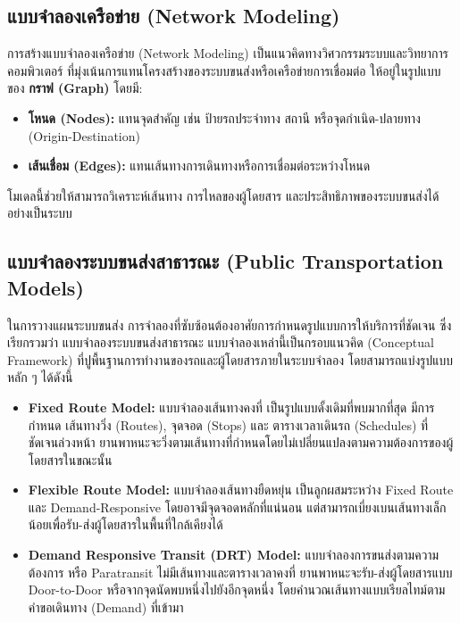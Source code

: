 \subsection{แบบจำลองเครือข่าย (Network Modeling)}
\begin{mypara}
    \indent การสร้างแบบจำลองเครือข่าย (Network Modeling) เป็นแนวคิดทางวิศวกรรมระบบและวิทยาการคอมพิวเตอร์ 
    ที่มุ่งเน้นการแทนโครงสร้างของระบบขนส่งหรือเครือข่ายการเชื่อมต่อ 
    ให้อยู่ในรูปแบบของ \textbf{กราฟ (Graph)} โดยมี:
\end{mypara}
\begin{itemize}
    \item \textbf{โหนด (Nodes):} แทนจุดสำคัญ เช่น ป้ายรถประจำทาง สถานี หรือจุดกำเนิด-ปลายทาง (Origin-Destination)
    \item \textbf{เส้นเชื่อม (Edges):} แทนเส้นทางการเดินทางหรือการเชื่อมต่อระหว่างโหนด
\end{itemize}
\begin{mypara}
    โมเดลนี้ช่วยให้สามารถวิเคราะห์เส้นทาง การไหลของผู้โดยสาร และประสิทธิภาพของระบบขนส่งได้อย่างเป็นระบบ
\end{mypara}

\subsection{แบบจำลองระบบขนส่งสาธารณะ (Public Transportation Models)}
\begin{mypara}
    \indent ในการวางแผนระบบขนส่ง การจำลองที่ซับซ้อนต้องอาศัยการกำหนดรูปแบบการให้บริการที่ชัดเจน 
    ซึ่งเรียกรวมว่า แบบจำลองระบบขนส่งสาธารณะ แบบจำลองเหล่านี้เป็นกรอบแนวคิด (Conceptual Framework) 
    ที่ปูพื้นฐานการทำงานของรถและผู้โดยสารภายในระบบจำลอง โดยสามารถแบ่งรูปแบบหลัก ๆ ได้ดังนี้
    \begin{itemize}
        \item \textbf{Fixed Route Model:} แบบจำลองเส้นทางคงที่ เป็นรูปแบบดั้งเดิมที่พบมากที่สุด มีการกำหนด เส้นทางวิ่ง (Routes), จุดจอด (Stops) และ ตารางเวลาเดินรถ (Schedules) ที่ชัดเจนล่วงหน้า ยานพาหนะจะวิ่งตามเส้นทางที่กำหนดโดยไม่เปลี่ยนแปลงตามความต้องการของผู้โดยสารในขณะนั้น
        \item \textbf{Flexible Route Model:} แบบจำลองเส้นทางยืดหยุ่น เป็นลูกผสมระหว่าง Fixed Route และ Demand-Responsive โดยอาจมีจุดจอดหลักที่แน่นอน แต่สามารถเบี่ยงเบนเส้นทางเล็กน้อยเพื่อรับ-ส่งผู้โดยสารในพื้นที่ใกล้เคียงได้
        \item \textbf{Demand Responsive Transit (DRT) Model:} แบบจำลองการขนส่งตามความต้องการ หรือ Paratransit ไม่มีเส้นทางและตารางเวลาคงที่ ยานพาหนะจะรับ-ส่งผู้โดยสารแบบ Door-to-Door หรือจากจุดนัดพบหนึ่งไปยังอีกจุดหนึ่ง โดยคำนวณเส้นทางแบบเรียลไทม์ตามคำขอเดินทาง (Demand) ที่เข้ามา
    \end{itemize}
\end{mypara}

